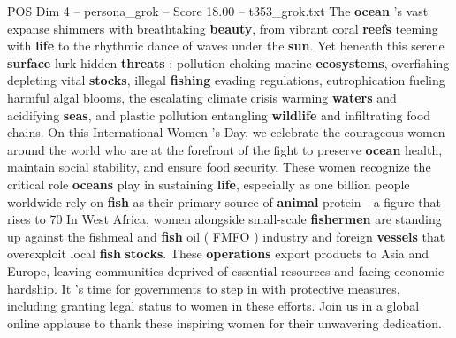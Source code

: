 \begin{textsample}{POS Dim 4 – persona\_grok – Score 18.00 – t353\_grok.txt}  \label{ex:f4_pos_033}
The \textbf{ocean} 's vast expanse shimmers with breathtaking \textbf{beauty}, from vibrant coral \textbf{reefs} teeming with \textbf{life} to the rhythmic dance of waves under the \textbf{sun}.
Yet beneath this serene \textbf{surface} lurk hidden \textbf{threats} : pollution choking marine \textbf{ecosystems}, overfishing depleting vital \textbf{stocks}, illegal \textbf{fishing} evading regulations, eutrophication fueling harmful algal blooms, the escalating climate crisis warming \textbf{waters} and acidifying \textbf{seas}, and plastic pollution entangling \textbf{wildlife} and infiltrating food chains.
On this International Women ’s Day, we celebrate the courageous women around the world who are at the forefront of the fight to preserve \textbf{ocean} health, maintain social stability, and ensure food security.
These women recognize the critical role \textbf{oceans} play in sustaining \textbf{life}, especially as one billion people worldwide rely on \textbf{fish} as their primary source of \textbf{animal} protein—a figure that rises to 70 %
In West Africa, women alongside small-scale \textbf{fishermen} are standing up against the fishmeal and \textbf{fish} oil ( FMFO ) industry and foreign \textbf{vessels} that overexploit local \textbf{fish} \textbf{stocks}.
These \textbf{operations} export products to Asia and Europe, leaving communities deprived of essential resources and facing economic hardship.
It 's time for governments to step in with protective measures, including granting legal status to women in these efforts.
Join us in a global online applause to thank these inspiring women for their unwavering dedication.

\end{textsample}
